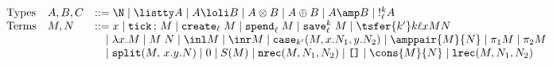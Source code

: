 \begin{small}
\[\begin{array}{lll}
\text{Types} & A,B,C & ::= \N \; | \; \listty A \; |\; A \loli B \;|\; A \otimes B \;|\; A \oplus B \;|\; A \amp B \;|\; !^k_\ell A\\
\text{Terms} & M,N & ::= x \; | \; \texttt{tick} \, ;\, M \;|\; \texttt{create}_\ell \; M \;|\; \texttt{spend}_\ell \; M \;|\;
\texttt{save}^k_\ell \; M  \;|\; \tsfer {k'} k {\ell} x M N\\
&& \quad | \; \lambda x.M \;|\; M \; N \;|\; \inl M \;|\; \inr M \;|\;
\texttt{case}_{k'}(M,x.N_1,y.N_2) \;|\; \amppair{M}{N} \;|\;
\pi_1 M \;|\; \pi_2 M\\
&& \quad |\; \texttt{split}(M,\, x.y.N) \;|\;
0 \;|\; S(M) \;|\; \texttt{nrec}(M,N_1,N_2) \;|\; \texttt{[]} \;|\;
\cons{M}{N} \;|\; \texttt{lrec}(M,N_1,N_2)\\
\end{array}
\]
\end{small}
